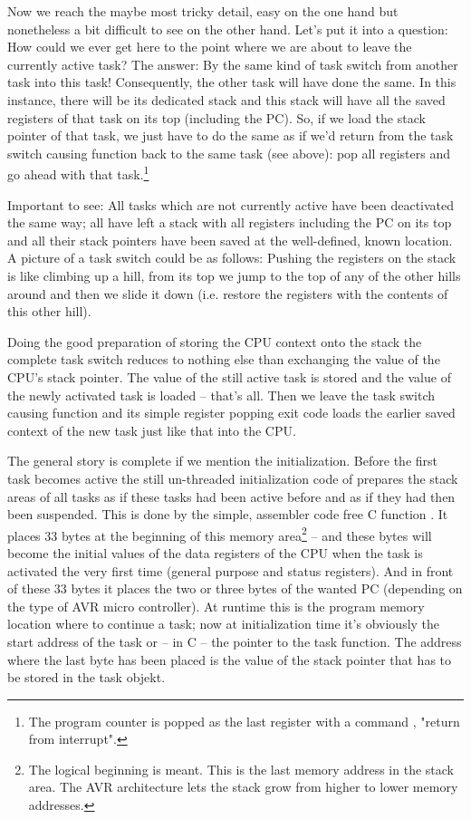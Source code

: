 Now we reach the maybe most tricky detail, easy on the one hand but
nonetheless a bit difficult to see on the other hand. Let's put it into a
question: How could we ever get here to the point where we are about to
leave the currently active task? The answer: By the same kind of task
switch from another task into this task! Consequently, the other task will
have done the same. In this instance, there will be its dedicated stack
and this stack will have all the saved registers of that task on its top
(including the PC). So, if we load the stack pointer of that task, we just
have to do the same as if we'd return from the task switch causing
function back to the same task (see above): pop all registers and go
ahead with that task.\footnote{The program counter is popped as the last
register with a command , "return from interrupt".}

Important to see: All tasks which are not currently active have been
deactivated the same way; all have left a stack with all registers
including the PC on its top and all their stack pointers have been saved
at the well-defined, known location. A picture of a task switch could be
as follows: Pushing the registers on the stack is like climbing up a hill,
from its top we jump to the top of any of the other hills around and then
we slide it down (i.e. restore the registers with the contents of this
other hill).

Doing the good preparation of storing the CPU context onto the stack the
complete task switch reduces to nothing else than exchanging the value of
the CPU's stack pointer. The value of the still active task is stored and
the value of the newly activated task is loaded -- that's all. Then we
leave the task switch causing function and its simple register popping
exit code loads the earlier saved context of the new task just like that
into the CPU.

The general story is complete if we mention the initialization. Before the
first task becomes active the still un-threaded initialization code of
\rtos{} prepares the stack areas of all tasks as if these tasks had been
active before and as if they had then been suspended. This is done by the
simple, assembler code free C function . It places
33 bytes at the beginning of this memory area\footnote{The logical
beginning is meant. This is the last memory address in the stack area. The
AVR architecture lets the stack grow from higher to lower memory
addresses.} -- and these bytes will become the initial values of the data
registers of the CPU when the task is activated the very first time
(general purpose and status registers). And in front of these 33 bytes it
places the two or three bytes of the wanted PC (depending on the type of
AVR micro controller). At runtime this is the program memory location where to continue
a task; now at initialization time it's obviously the start address of the
task or -- in C -- the pointer to the task function. The address where the
last byte has been placed is the value of the stack pointer that has to be
stored in the task objekt.

